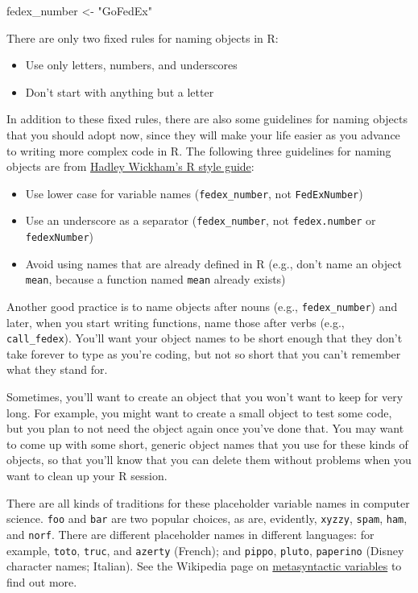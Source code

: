 \documentclass[]{book}
\makeatletter
\newenvironment{Shaded}{\begin{snugshade}}{\end{snugshade}}
\newcommand{\StringTok}[1]{\textcolor[rgb]{0.31,0.60,0.02}{{#1}}}
\newcommand{\NormalTok}[1]{{#1}}
\providecommand{\tightlist}{%
  \setlength{\itemsep}{0pt}\setlength{\parskip}{0pt}}
\newenvironment{kframe}{%
\medskip{}
\setlength{\fboxsep}{.8em}
 \def\at@end@of@kframe{}%
 \ifinner\ifhmode%
  \def\at@end@of@kframe{\end{minipage}}%
  \begin{minipage}{\columnwidth}%
 \fi\fi%
 \def\FrameCommand##1{\hskip\@totalleftmargin \hskip-\fboxsep
 \colorbox{shadecolor}{##1}\hskip-\fboxsep
     \hskip-\linewidth \hskip-\@totalleftmargin \hskip\columnwidth}%
 \MakeFramed {\advance\hsize-\width
   \@totalleftmargin\z@ \linewidth\hsize
   \@setminipage}}%
 {\par\unskip\endMakeFramed%
 \at@end@of@kframe}
\renewenvironment{Shaded}{\begin{kframe}}{\end{kframe}}
\newenvironment{rmdblock}[1]
  {
  \begin{itemize}
  \renewcommand{\labelitemi}{
    \raisebox{-.7\height}[0pt][0pt]{
      {\setkeys{Gin}{width=3em,keepaspectratio}\texttt{[image: images/\#1]}}
    }
  }
  \setlength{\fboxsep}{1em}
  \begin{kframe}
  \item
  }
  {
  \end{kframe}
  \end{itemize}
  }
\newenvironment{rmdtip}
  {\begin{rmdblock}{tip}}
  {\end{rmdblock}}
\makeatother
\begin{document}
\begin{Shaded}
\begin{Highlighting}[]
\NormalTok{fedex_number <-}\StringTok{ "GoFedEx"}
\end{Highlighting}
\end{Shaded}

There are only two fixed rules for naming objects in R:

\begin{itemize}
\tightlist
\item
  Use only letters, numbers, and underscores
\item
  Don't start with anything but a letter
\end{itemize}

In addition to these fixed rules, there are also some guidelines for
naming objects that you should adopt now, since they will make your life
easier as you advance to writing more complex code in R. The following
three guidelines for naming objects are from
\href{http://adv-r.had.co.nz/Style.html}{Hadley Wickham's R style
guide}:

\begin{itemize}
\tightlist
\item
  Use lower case for variable names (\texttt{fedex\_number}, not
  \texttt{FedExNumber})
\item
  Use an underscore as a separator (\texttt{fedex\_number}, not
  \texttt{fedex.number} or \texttt{fedexNumber})
\item
  Avoid using names that are already defined in R (e.g., don't name an
  object \texttt{mean}, because a function named \texttt{mean} already
  exists)
\end{itemize}

Another good practice is to name objects after nouns (e.g.,
\texttt{fedex\_number}) and later, when you start writing functions,
name those after verbs (e.g., \texttt{call\_fedex}). You'll want your
object names to be short enough that they don't take forever to type as
you're coding, but not so short that you can't remember what they stand
for.

\begin{rmdtip}
Sometimes, you'll want to create an object that you won't want to keep
for very long. For example, you might want to create a small object to
test some code, but you plan to not need the object again once you've
done that. You may want to come up with some short, generic object names
that you use for these kinds of objects, so that you'll know that you
can delete them without problems when you want to clean up your R
session.

There are all kinds of traditions for these placeholder variable names
in computer science. \texttt{foo} and \texttt{bar} are two popular
choices, as are, evidently, \texttt{xyzzy}, \texttt{spam}, \texttt{ham},
and \texttt{norf}. There are different placeholder names in different
languages: for example, \texttt{toto}, \texttt{truc}, and
\texttt{azerty} (French); and \texttt{pippo}, \texttt{pluto},
\texttt{paperino} (Disney character names; Italian). See the Wikipedia
page on
\href{https://en.wikipedia.org/wiki/Metasyntactic_variable}{metasyntactic
variables} to find out more.
\end{rmdtip}
\end{document}
